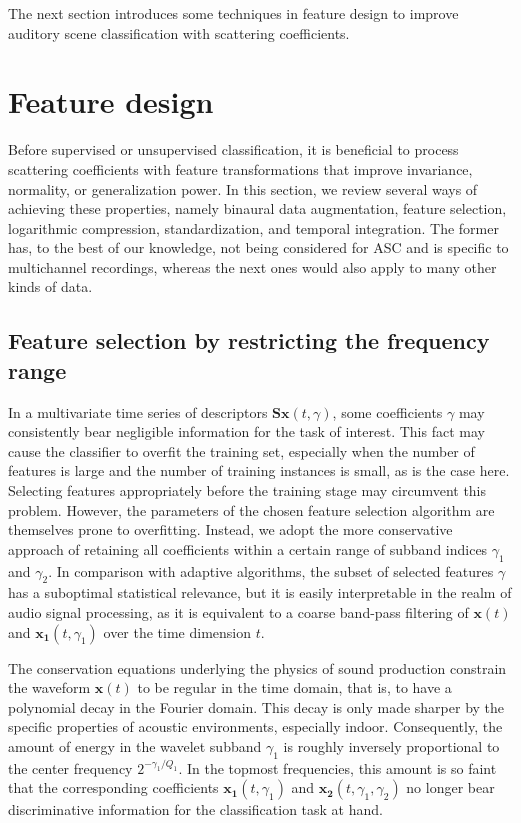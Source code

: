 \documentclass[journal]{IEEEtran}
\begin{document}
The next section introduces some techniques in feature design to improve auditory scene classification with scattering coefficients.

\section{Feature design}
Before supervised or unsupervised classification, it is beneficial to process scattering coefficients with feature transformations that improve invariance, normality, or generalization power. 
In this section, we review several ways of achieving these properties, namely binaural data augmentation, feature selection, logarithmic compression, standardization, and temporal integration.
The former has, to the best of our knowledge, not being considered for ASC and is specific to multichannel recordings, whereas the next ones would also apply to many other kinds of data.

\subsection{Feature selection by restricting the frequency range}
In a multivariate time series of descriptors $\mathbf{S}\boldsymbol{x}(t,\gamma)$, some coefficients $\gamma$ may consistently bear negligible information for the task of interest.
This fact may cause the classifier to overfit the training set, especially when the number of features is large and the number of training instances is small, as is the case here.
Selecting features appropriately before the training stage may circumvent this problem.
However, the parameters of the chosen feature selection algorithm are themselves prone to overfitting.
Instead, we adopt the more conservative approach of retaining all coefficients within a certain range of subband indices $\gamma_1$ and $\gamma_2$.
In comparison with adaptive algorithms, the subset of selected features $\gamma$ has a suboptimal statistical relevance, but it is easily interpretable in the realm of audio signal processing, as it is equivalent to a coarse band-pass filtering of $\boldsymbol{x}(t)$ and $\boldsymbol{x_1}(t,\gamma_1)$ over the time dimension $t$.

The conservation equations underlying the physics of sound production constrain the waveform $\boldsymbol{x}(t)$ to be regular in the time domain, that is, to have a polynomial decay in the Fourier domain.
This decay is only made sharper by the specific properties of acoustic environments, especially indoor.
Consequently, the amount of energy in the wavelet subband $\gamma_1$ is roughly inversely proportional to the center frequency $2^{-\gamma_1/Q_1}$.
In the topmost frequencies, this amount is so faint that the corresponding coefficients $\boldsymbol{x_1}(t,\gamma_1)$ and $\boldsymbol{x_2}(t,\gamma_1,\gamma_2)$ no longer bear discriminative information for the classification task at hand.
\end{document}
